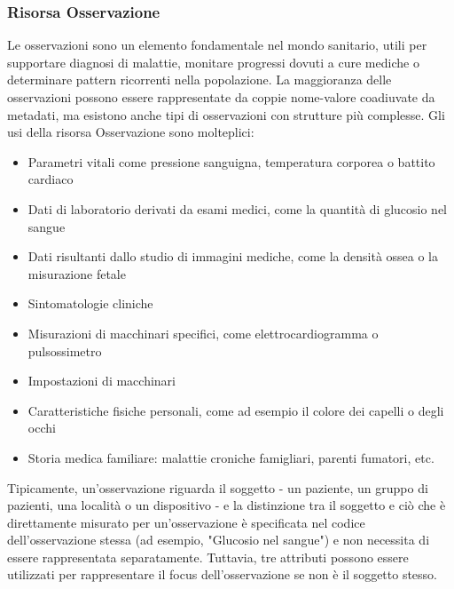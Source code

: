 \documentclass[a4paper]{article}
\begin{document}
\subsubsection{Risorsa Osservazione}
Le osservazioni sono un elemento fondamentale nel mondo sanitario, utili per supportare diagnosi di malattie, monitare progressi
dovuti a cure mediche o determinare pattern ricorrenti nella popolazione.
La maggioranza delle osservazioni possono essere rappresentate da coppie nome-valore coadiuvate da metadati, ma esistono anche tipi di osservazioni con strutture più complesse.
Gli usi della risorsa Osservazione sono molteplici:
\begin{itemize}
    \item Parametri vitali come pressione sanguigna, temperatura corporea o battito cardiaco
    \item Dati di laboratorio derivati da esami medici, come la quantità di glucosio nel sangue
    \item Dati risultanti dallo studio di immagini mediche, come la densità ossea o la misurazione fetale
    \item Sintomatologie cliniche
    \item Misurazioni di macchinari specifici, come elettrocardiogramma o pulsossimetro
    \item Impostazioni di macchinari
    \item Caratteristiche fisiche personali, come ad esempio il colore dei capelli o degli occhi
    \item Storia medica familiare: malattie croniche famigliari, parenti fumatori, etc.
\end{itemize}
Tipicamente, un'osservazione riguarda il soggetto - un paziente, un gruppo di pazienti, una località o un dispositivo - e la distinzione tra il soggetto e ciò che è direttamente
misurato per un'osservazione è specificata nel codice dell'osservazione stessa (ad esempio, "Glucosio nel sangue") e non necessita di essere rappresentata separatamente.
Tuttavia, tre attributi possono essere utilizzati per rappresentare il focus dell'osservazione se non è il soggetto stesso.
\end{document}
